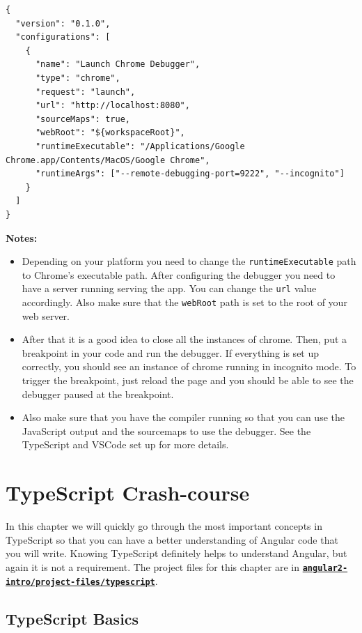 \documentclass[12pt,]{article}
\begin{document}
\begin{verbatim}
{
  "version": "0.1.0",
  "configurations": [
    {
      "name": "Launch Chrome Debugger",
      "type": "chrome",
      "request": "launch",
      "url": "http://localhost:8080",
      "sourceMaps": true,
      "webRoot": "${workspaceRoot}",
      "runtimeExecutable": "/Applications/Google Chrome.app/Contents/MacOS/Google Chrome",
      "runtimeArgs": ["--remote-debugging-port=9222", "--incognito"]
    }
  ]
}
\end{verbatim}

\textbf{Notes:}

\begin{itemize}
\item
  Depending on your platform you need to change the
  \texttt{runtimeExecutable} path to Chrome's executable path. After
  configuring the debugger you need to have a server running serving the
  app. You can change the \texttt{url} value accordingly. Also make sure
  that the \texttt{webRoot} path is set to the root of your web server.
\item
  After that it is a good idea to close all the instances of chrome.
  Then, put a breakpoint in your code and run the debugger. If
  everything is set up correctly, you should see an instance of chrome
  running in incognito mode. To trigger the breakpoint, just reload the
  page and you should be able to see the debugger paused at the
  breakpoint.
\item
  Also make sure that you have the compiler running so that you can use
  the JavaScript output and the sourcemaps to use the debugger. See the
  TypeScript and VSCode set up for more details.
\end{itemize}

\section{TypeScript Crash-course}\label{typescript-crash-course}

In this chapter we will quickly go through the most important concepts
in TypeScript so that you can have a better understanding of Angular
code that you will write. Knowing TypeScript definitely helps to
understand Angular, but again it is not a requirement. The project files
for this chapter are in
\href{https://github.com/aminmeyghani/angular2-intro/tree/master/project-files/typescript}{\textbf{\texttt{angular2-intro/project-files/typescript}}}.

\subsection{TypeScript Basics}\label{typescript-basics}
\end{document}
